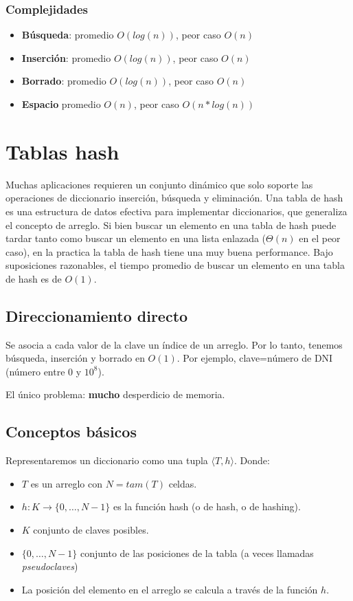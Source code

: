 \subsubsection{Complejidades}

\begin{itemize}
 \item \textbf{B\'usqueda}: promedio $O(log(n))$, peor caso $O(n)$
 \item \textbf{Inserci\'on}: promedio $O(log(n))$, peor caso $O(n)$
 \item \textbf{Borrado}: promedio $O(log(n))$, peor caso $O(n)$
 \item \textbf{Espacio} promedio $O(n)$, peor caso $O(n*log(n))$
\end{itemize}

\newpage
\section{Tablas hash}

Muchas aplicaciones requieren un conjunto din\'amico que solo soporte las operaciones de diccionario inserci\'on, b\'usqueda y eliminaci\'on. Una tabla de hash es una estructura de datos efectiva para implementar diccionarios, que generaliza el concepto de arreglo. Si bien buscar un elemento en una tabla de hash puede tardar tanto como buscar un elemento en una lista enlazada ($\Theta(n)$ en el peor caso), en la practica la tabla de hash tiene una muy buena performance. Bajo suposiciones razonables, el tiempo promedio de buscar un elemento en una tabla de hash es de $O(1)$.

\subsection{Direccionamiento directo}
Se asocia a cada valor de la clave un \'indice de un arreglo. Por lo tanto, tenemos b\'usqueda, inserci\'on y borrado en $O(1)$. Por ejemplo, clave=n\'umero de DNI (n\'umero entre 0 y $10^8$).

El \'unico problema: \textbf{mucho} desperdicio de memoria.

\subsection{Conceptos b\'asicos}
Representaremos un diccionario como una tupla $\langle T,h \rangle$. Donde:
\begin{itemize}
 \item $T$ es un arreglo con $N=tam(T)$ celdas.
 \item $h: K \rightarrow\{0,\dots,N-1\}$ es la funci\'on hash (o de hash, o de hashing).
 \item $K$ conjunto de claves posibles.
 \item $\{0,\dots,N-1\}$ conjunto de las posiciones de la tabla (a veces llamadas \textit{pseudoclaves})
 \item La posici\'on del elemento en el arreglo se calcula a trav\'es de la funci\'on $h$.
\end{itemize}


